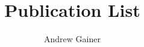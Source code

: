 \documentclass{article}
\author{Andrew Gainer}
\title{Publication List}
\begin{document}
\maketitle

\nocite{*}



\end{document}
